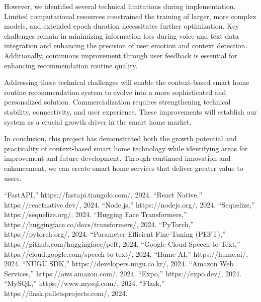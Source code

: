 \documentclass[conference]{IEEEtran}
\begin{document}
However, we identified several technical limitations during implementation. Limited computational resources constrained the training of larger, more complex models, and extended epoch duration necessitates further optimization. Key challenges remain in minimizing information loss during voice and text data integration and enhancing the precision of user emotion and context detection. Additionally, continuous improvement through user feedback is essential for enhancing recommendation routine quality.

Addressing these technical challenges will enable the context-based smart home routine recommendation system to evolve into a more sophisticated and personalized solution. Commercialization requires strengthening technical stability, connectivity, and user experience. These improvements will establish our system as a crucial growth driver in the smart home market.

In conclusion, this project has demonstrated both the growth potential and practicality of context-based smart home technology while identifying areas for improvement and future development. Through continued innovation and enhancement, we can create smart home services that deliver greater value to users.

\vspace{2em}

\begin{thebibliography}{9}
 “FastAPI,” https://fastapi.tiangolo.com/, 2024.
 “React Native,” https://reactnative.dev/, 2024.
 “Node.js,” https://nodejs.org/, 2024.
 “Sequelize,” https://sequelize.org/, 2024.
 “Hugging Face Transformers,” https://huggingface.co/docs/transformers/, 2024.
 “PyTorch,” https://pytorch.org/, 2024.
 “Parameter-Efficient Fine-Tuning (PEFT),” https://github.com/huggingface/peft, 2024.
 “Google Cloud Speech-to-Text,” https://cloud.google.com/speech-to-text/, 2024.
 “Hume AI,” https://hume.ai/, 2024.
 “NUGU SDK,” https://developers.nugu.co.kr/, 2024.
 “Amazon Web Services,” https://aws.amazon.com/, 2024.
 “Expo,” https://expo.dev/, 2024.
 “MySQL,” https://www.mysql.com/, 2024.
 “Flask,” https://flask.palletsprojects.com/, 2024.
\end{thebibliography}
\end{document}
